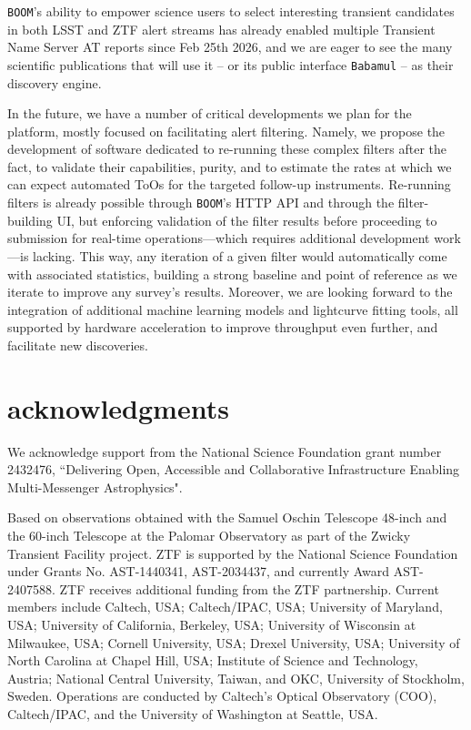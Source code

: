 \documentclass[twocolumn]{aastex631}
\begin{document}
\texttt{BOOM}'s ability to empower science users to select interesting transient candidates in both LSST and ZTF alert streams has already enabled multiple Transient Name Server AT reports since Feb 25th 2026, and we are eager to see the many scientific publications that will use it -- or its public interface \texttt{Babamul} -- as their discovery engine.

In the future, we have a number of critical developments we plan for the platform, mostly focused on facilitating alert filtering. Namely, we propose the development of software dedicated to re-running these complex filters after the fact, to validate their capabilities, purity, and to estimate the rates at which we can expect automated ToOs for the targeted follow-up instruments.
Re-running filters is already possible through \texttt{BOOM}'s HTTP API and through the filter-building UI, but enforcing validation of the filter results before proceeding to submission for real-time operations---which requires additional development work---is lacking. This way, any iteration of a given filter would automatically come with associated statistics, building a strong baseline and point of reference as we iterate to improve any survey's results. Moreover, we are looking forward to the integration of additional machine learning models and lightcurve fitting tools, all supported by hardware acceleration to improve throughput even further, and facilitate new discoveries.

\section*{acknowledgments}
\label{sec:acknowledgments}

We acknowledge support from the National Science Foundation grant number 2432476, ``Delivering Open, Accessible and Collaborative Infrastructure Enabling Multi-Messenger Astrophysics".

Based on observations obtained with the Samuel Oschin Telescope 48-inch and the 60-inch Telescope at the Palomar Observatory as part of the Zwicky Transient Facility project. ZTF is supported by the National Science Foundation under Grants No. AST-1440341, AST-2034437, and currently Award AST-2407588. ZTF receives additional funding from the ZTF partnership. Current members include Caltech, USA; Caltech/IPAC, USA; University of Maryland, USA; University of California, Berkeley, USA; University of Wisconsin at Milwaukee, USA; Cornell University, USA; Drexel University, USA; University of North Carolina at Chapel Hill, USA; Institute of Science and Technology, Austria; National Central University, Taiwan, and OKC, University of Stockholm, Sweden. Operations are conducted by Caltech's Optical Observatory (COO), Caltech/IPAC, and the University of Washington at Seattle, USA.
\end{document}
